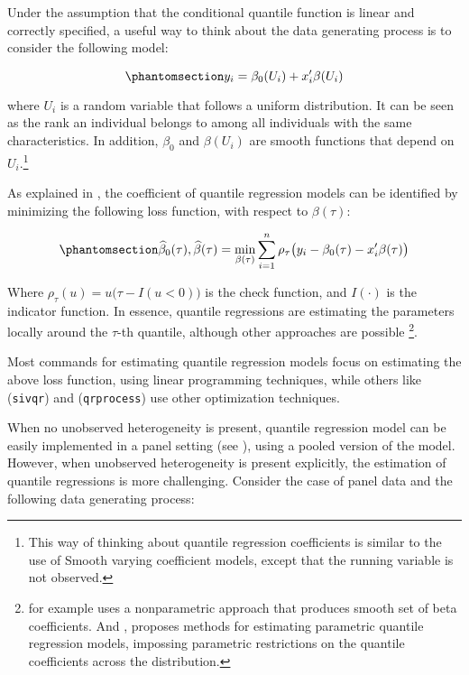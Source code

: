 \documentclass[bib]{statapress}
\begin{document}
Under the assumption that the conditional quantile function is linear
and correctly specified, a useful way to think about the data generating
process is to consider the following model:

\begin{equation}\phantomsection\label{eq-dgp}{y_i = \beta_0(U_i)+x_i'\beta(U_i) 
}\end{equation}

where \(U_i\) is a random variable that follows a uniform distribution.
It can be seen as the rank an individual belongs to among all
individuals with the same characteristics. In addition, \(\beta_0\) and
\(\beta(U_i)\) are smooth functions that depend on \(U_i\).\footnote{This
  way of thinking about quantile regression coefficients is similar to
  the use of Smooth varying coefficient models, except that the running
  variable is not observed.}

As explained in \citet{wooldridge2010}, the coefficient of quantile
regression models can be identified by minimizing the following loss
function, with respect to \(\beta(\tau)\):

\begin{equation}\phantomsection\label{eq-qloss}{
\hat\beta_0(\tau),\hat\beta(\tau) = \min_{\beta(\tau)} \sum_{i=1}^{n} \rho_\tau \big(y_i-\beta_0(\tau)-x_i'\beta(\tau)\big)
}\end{equation}

Where \(\rho_\tau(u)=u\big(\tau-I(u<0)\big)\) is the check function, and
\(I(\cdot)\) is the indicator function. In essence, quantile regressions
are estimating the parameters locally around the \(\tau\)-th quantile,
although other approaches are possible \footnote{\citet{kaplan2017} for
  example uses a nonparametric approach that produces smooth set of beta
  coefficients. And \citet{bottai2019}, proposes methods for estimating
  parametric quantile regression models, impossing parametric
  restrictions on the quantile coefficients across the distribution.}.

Most commands for estimating quantile regression models focus on
estimating the above loss function, using linear programming techniques,
while others like \citet{kaplan2017} (\texttt{sivqr}) and
\citet{chernozhukov2022} (\texttt{qrprocess}) use other optimization
techniques.

When no unobserved heterogeneity is present, quantile regression model
can be easily implemented in a panel setting (see
\citet{wooldridge2010}), using a pooled version of the model. However,
when unobserved heterogeneity is present explicitly, the estimation of
quantile regressions is more challenging. Consider the case of panel
data and the following data generating process:
\end{document}
